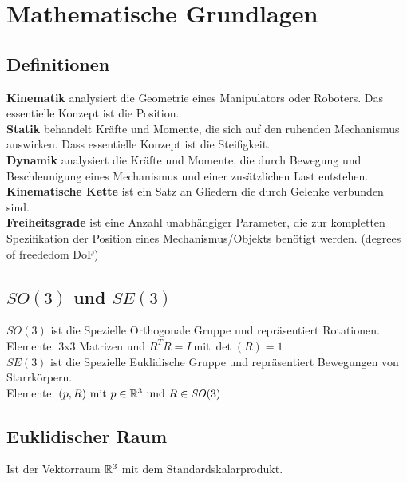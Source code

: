 

\section{Mathematische Grundlagen}

\newcommand{\SO}{\ensuremath{\mathit{SO}(3)}\xspace}
\newcommand{\SE}{\ensuremath{\mathit{SE}(3)}\xspace}
\newcommand{\myMatrix}[1]{\ensuremath{\begin{pmatrix}#1\end{pmatrix}}}
\newcommand{\myVector}[1]{\ensuremath{\begin{pmatrix}#1\end{pmatrix}}}
\newcommand{\quaternionen}{\ensuremath{\mathbb{H}}\xspace}

\subsection{Definitionen}
\textbf{Kinematik} analysiert die Geometrie eines Manipulators oder Roboters. Das essentielle Konzept ist die Position.\\
\textbf{Statik} behandelt Kräfte und Momente, die sich auf den ruhenden Mechanismus auswirken. Dass essentielle Konzept
ist die Steifigkeit.\\
\textbf{Dynamik} analysiert die Kräfte und Momente, die durch Bewegung und Beschleunigung eines Mechanismus und einer
zusätzlichen Last entstehen.\\
\textbf{Kinematische Kette} ist ein Satz an Gliedern die durch Gelenke verbunden sind.\\
\textbf{Freiheitsgrade} ist eine Anzahl unabhängiger Parameter, die zur kompletten Spezifikation der Position eines
Mechanismus/Objekts benötigt werden. (degrees of freededom DoF)

\subsection{\SO und \SE}
\SO ist die Spezielle Orthogonale Gruppe und repräsentiert Rotationen.\\
Elemente: 3x3 Matrizen und \(R^TR = I\ \text{mit}\ \det(R) = 1\)\\
\SE ist die Spezielle Euklidische Gruppe und repräsentiert Bewegungen von Starrkörpern.\\
Elemente: \((p, R)\ \text{mit}\ p \in \realnumbers^3\ \text{und}\ R \in \SO\)

\subsection{Euklidischer Raum}
Ist der Vektorraum \(\mathbb{R}^3\) mit dem Standardskalarprodukt.

